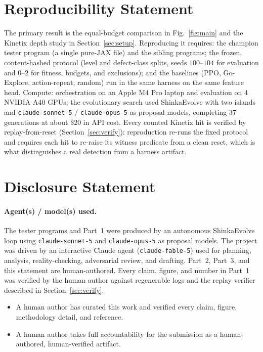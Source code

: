 \documentclass{article}
\begin{document}
\section{Reproducibility Statement}
The primary result is the equal-budget comparison in Fig.~\ref{fig:main} and the Kinetix depth study in
Section~\ref{sec:setup}. Reproducing it requires: the champion tester program (a single pure-JAX file) and the sibling
programs; the frozen, content-hashed protocol (level and defect-class splits, seeds $100$--$104$ for evaluation and
$0$--$2$ for fitness, budgets, and exclusions); and the baselines (PPO, Go-Explore, action-repeat, random) run in the same
harness on the same feature head. Compute: orchestration on an Apple M4 Pro laptop and evaluation on 4 NVIDIA A40 GPUs; the
evolutionary search used ShinkaEvolve with two islands and \texttt{claude-sonnet-5} / \texttt{claude-opus-5} as proposal
models, completing $37$ generations at about \$20 in API cost. Every counted Kinetix hit is verified by replay-from-reset
(Section~\ref{sec:verify}): reproduction re-runs the fixed protocol and requires each hit to re-raise its witness predicate
from a clean reset, which is what distinguishes a real detection from a harness artifact.

\section{Disclosure Statement}

\paragraph{Agent(s) / model(s) used.}
The tester programs and Part~1 were produced by an autonomous ShinkaEvolve loop using \texttt{claude-sonnet-5} and
\texttt{claude-opus-5} as proposal models. The project was driven by an interactive Claude agent (\texttt{claude-fable-5})
used for planning, analysis, reality-checking, adversarial review, and drafting. Part~2, Part~3, and this statement are
human-authored. Every claim, figure, and number in Part~1 was verified by the human author against regenerable logs and
the replay verifier described in Section~\ref{sec:verify}.

\begin{itemize}
  \item[$\boxtimes$] A human author has curated this work and verified every claim,
    figure, methodology detail, and reference.
  \item[$\boxtimes$] A human author takes full accountability for the submission as
    a human-authored, human-verified artifact.
\end{itemize}





\end{document}
